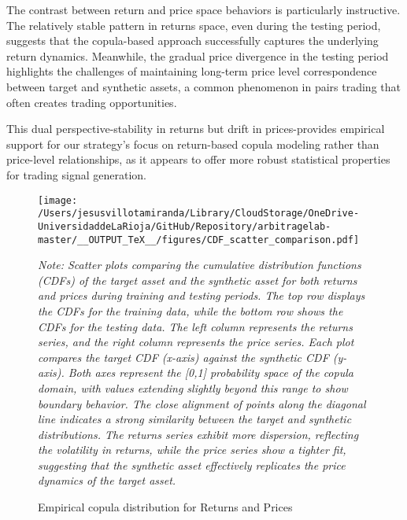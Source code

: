 The contrast between return and price space behaviors is particularly instructive. The relatively stable pattern in returns space, even during the testing period, suggests that the copula-based approach successfully captures the underlying return dynamics. Meanwhile, the gradual price divergence in the testing period highlights the challenges of maintaining long-term price level correspondence between target and synthetic assets, a common phenomenon in pairs trading that often creates trading opportunities.

This dual perspective-stability in returns but drift in prices-provides empirical support for our strategy's focus on return-based copula modeling rather than price-level relationships, as it appears to offer more robust statistical properties for trading signal generation.

\begin{figure}[H]
  \caption{Empirical copula distribution for Returns and Prices}
  \centering
  \texttt{[image: /Users/jesusvillotamiranda/Library/CloudStorage/OneDrive-UniversidaddeLaRioja/GitHub/Repository/arbitragelab-master/\_\_OUTPUT\_TeX\_\_/figures/CDF\_scatter\_comparison.pdf]}
  \label{fig:CDF_scatter_comparison}
\vspace{0.5cm}
\begin{minipage}{\textwidth}
\setlength{\parindent}{0pt}
\footnotesize\textit{Note: 
Scatter plots comparing the cumulative distribution functions (CDFs) of the target asset and the synthetic asset for both returns and prices during training and testing periods. The top row displays the CDFs for the training data, while the bottom row shows the CDFs for the testing data. The left column represents the returns series, and the right column represents the price series. Each plot compares the target CDF (x-axis) against the synthetic CDF (y-axis). Both axes represent the [0,1] probability space of the copula domain, with values extending slightly beyond this range to show boundary behavior. The close alignment of points along the diagonal line indicates a strong similarity between the target and synthetic distributions. The returns series exhibit more dispersion, reflecting the volatility in returns, while the price series show a tighter fit, suggesting that the synthetic asset effectively replicates the price dynamics of the target asset.
}
\end{minipage}

\end{figure}


